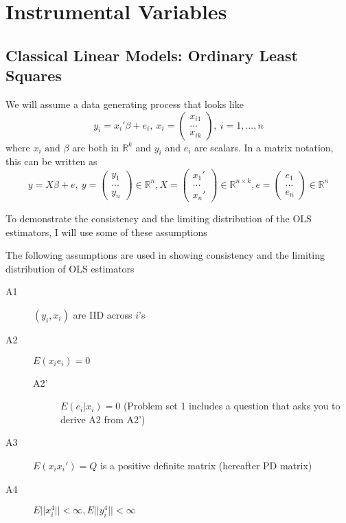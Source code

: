 

\chapter{Instrumental Variables}
\section{Classical Linear Models: Ordinary Least Squares}
We will assume a data generating process that looks like
\[
y_i = x_i'\beta+e_i, \ x_i = \begin{pmatrix} x_{i1} \\ ... \\ x_{ik}\end{pmatrix}, \ i=1,...,n
\]
where $x_i\text{ and }\beta $ are both in $\mathbb{R}^k$ and $y_i$ and $e_i$ are scalars. In a matrix notation, this can be written as
\[
y=X\beta+e, \ y = \begin{pmatrix} y_{1} \\ ... \\ y_{n}\end{pmatrix}\in\mathbb{R}^n, X = \begin{pmatrix} x_{1}' \\ ... \\ x_{n}'\end{pmatrix} \in\mathbb{R}^{n\times k}, e = \begin{pmatrix} e_{1} \\ ... \\ e_{n}\end{pmatrix}\in\mathbb{R}^n
\]\par
To demonstrate the consistency and the limiting distribution of the OLS estimators, I will use some of these assumptions
\begin{mdframed}[backgroundcolor=blue!5] 
\begin{assumption}
\item The following assumptions are used in showing consistency and the limiting distribution of OLS estimators
\begin{description}
\item[A1] $(y_i, x_i)$ are IID across $i$'s
\item[A2] $E(x_ie_i)=0$
\begin{description}
\item[A2'] $E(e_i|x_i)=0$ (Problem set 1 includes a question that asks you to derive A2 from A2')
\end{description}
\item[A3] $E(x_ix_i')=Q$ is a positive definite matrix (hereafter PD matrix)
\item[A4] $E||x_i^4||<\infty, E||y_i^4||<\infty$
\end{description}
\end{assumption}
\end{mdframed} \par
